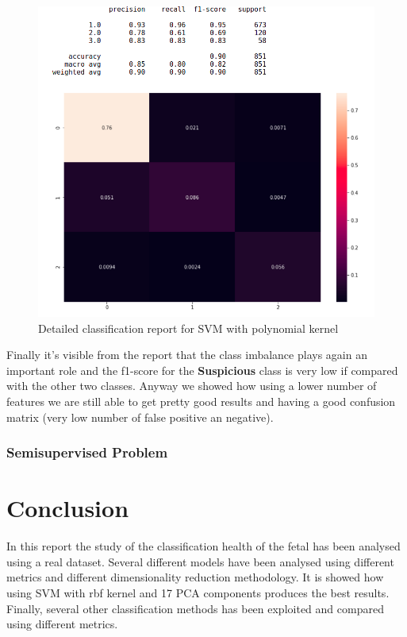 \documentclass[a4paper,12pt]{article}
\begin{document}
\begin{figure}[H]
  \begin{center}
  \includegraphics[width=1.0\textwidth]{images/svm_poly.png}
  \end{center}
  \caption{Detailed classification report for SVM with polynomial kernel}
  \label{fig:poly}
\end{figure}

\noindent Finally it's visible from the report that the class imbalance plays again an important role and the f1-score for the \textbf{Suspicious} class is very low if compared with the other two classes. Anyway we showed how using a lower number of features we are still able to get pretty good results and having a good confusion matrix (very low number of false positive an negative).

\subsubsection{Semisupervised Problem}

\section{Conclusion}

In this report the study of the classification health of the fetal has been analysed using a real dataset. Several different models have been analysed using different metrics and different dimensionality reduction methodology. It is showed how using SVM with rbf kernel and 17 PCA components produces the best results. Finally, several other classification methods has been exploited and compared using different metrics.
\end{document}
